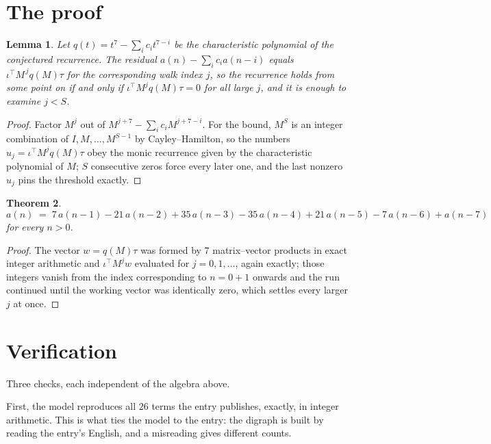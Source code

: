 \documentclass[11pt,a4paper]{article}
\theoremstyle{plain}
\newtheorem{theorem}{Theorem}
\newtheorem{lemma}[theorem]{Lemma}
\theoremstyle{definition}
\begin{document}
\section{The proof}

\begin{lemma}\label{lem:crit}
Let $q(t)=t^{7}-\sum_i c_it^{7-i}$ be the characteristic polynomial of the
conjectured recurrence. The residual $a(n)-\sum_ic_ia(n-i)$ equals
$\iota^{\!\top}M^{\,j}q(M)\tau$ for the corresponding walk index $j$, so the recurrence
holds from some point on if and only if $\iota^{\!\top}M^{j}q(M)\tau=0$ for all large $j$,
and it is enough to examine $j<S$.
\end{lemma}

\begin{proof}
Factor $M^{j}$ out of $M^{j+7}-\sum_ic_iM^{j+7-i}$. For the bound, $M^{S}$
is an integer combination of $I,M,\dots,M^{S-1}$ by Cayley--Hamilton, so the numbers
$u_j=\iota^{\!\top}M^{j}q(M)\tau$ obey the monic recurrence given by the characteristic
polynomial of $M$; $S$ consecutive zeros force every later one, and the last nonzero $u_j$
pins the threshold exactly.
\end{proof}

\begin{theorem}
\[
a(n)\;=\;7\,a(n-1) - 21\,a(n-2) + 35\,a(n-3) - 35\,a(n-4) + 21\,a(n-5) - 7\,a(n-6) + a(n-7)
\]
for every $n>0$.
\end{theorem}

\begin{proof}
The vector $w=q(M)\tau$ was formed by $7$ matrix--vector products in exact integer
arithmetic and $\iota^{\!\top}M^{j}w$ evaluated for $j=0,1,\dots$, again exactly; those
integers vanish from the index corresponding to $n=0+1$ onwards and the run continued
until the working vector was identically zero, which settles every larger $j$ at once.
\end{proof}

\section{Verification}

Three checks, each independent of the algebra above.

First, the model reproduces all $26$ terms the entry publishes, exactly, in integer
arithmetic. This is what ties the model to the entry: the digraph is built by reading the
entry's English, and a misreading gives different counts.
\end{document}
